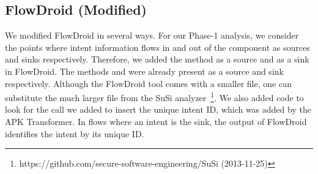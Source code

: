 {\subsection{FlowDroid (Modified)} \label{para:fd_mod}
We modified FlowDroid in several ways. For our Phase-1 analysis, we consider the points where intent information flows in and out of the component as sources and sinks respectively. 
Therefore, we added the method  as a source and
 as a sink in FlowDroid. The methods  and  were already present as a source and sink respectively.
Although the FlowDroid tool comes with a smaller   file, one can substitute the much larger  file from the SuSi analyzer~\cite{rab14classifying}\footnote{{https://github.com/secure-software-engineering/SuSi} (2013-11-25)}.
We also added code to look for the  call we added to insert the unique intent ID, which was added by the APK Transformer.
In flows where an intent is the sink, the output of FlowDroid identifies the intent by its unique ID.

}

